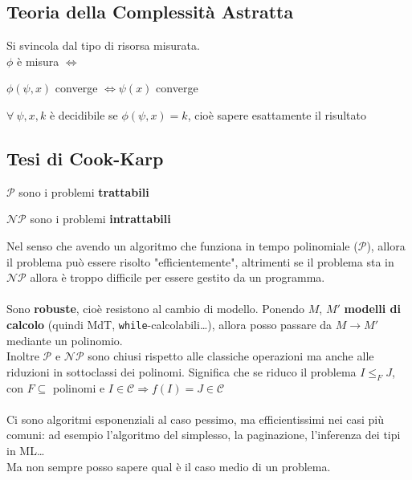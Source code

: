 \documentclass[10pt]{book}
\begin{document}
\subsection{Teoria della Complessità Astratta}
Si svincola dal tipo di risorsa misurata.\\
$\phi$ è misura $\Leftrightarrow$ \begin{list}{}{}
	\item $\phi(\psi, x)$ converge $\Leftrightarrow \psi(x)$ converge
	\item $\forall\:\psi, x, k$ è decidibile se $\phi(\psi, x) = k$, cioè sapere esattamente il risultato
\end{list}
\subsection{Tesi di Cook-Karp}
\begin{list}{-}{}
	\item $\mathscr{P}$ sono i problemi \textbf{trattabili}
	\item $\mathscr{NP}$ sono i problemi \textbf{intrattabili}
\end{list}
Nel senso che avendo un algoritmo che funziona in tempo polinomiale ($\mathscr{P}$), allora il problema può essere risolto "efficientemente", altrimenti se il problema sta in $\mathscr{NP}$ allora è troppo difficile per essere gestito da un programma.\\\\
Sono \textbf{robuste}, cioè resistono al cambio di modello. Ponendo $M$, $M'$ \textbf{modelli di calcolo} (quindi MdT, \texttt{while}-calcolabili\ldots), allora posso passare da $M \longrightarrow M'$ mediante un polinomio.\\
Inoltre $\mathscr{P}$ e $\mathscr{NP}$ sono chiusi rispetto alle classiche operazioni ma anche alle riduzioni in sottoclassi dei polinomi. Significa che se riduco il problema $I \leq_F J$, con $F \subseteq$ polinomi e $I\in\mathscr{C} \Rightarrow f(I) = J \in\mathscr{C}$\\\\
Ci sono algoritmi esponenziali al caso pessimo, ma efficientissimi nei casi più comuni: ad esempio l'algoritmo del simplesso, la paginazione, l'inferenza dei tipi in ML\ldots\\
Ma non sempre posso sapere qual è il caso medio di un problema.
\end{document}
